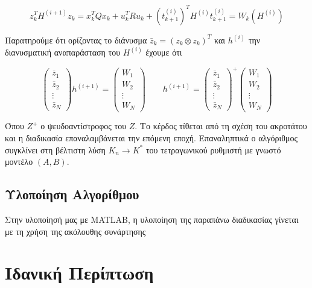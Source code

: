 \documentclass[a4paper,oneside,12pt]{article}
\begin{document}
$$z_k^T H^{(i+1)} z_k = x_k^T Q x_k + u_k^T R u_k + \left (t_{k+1}^{(i)} \right )^T H^{(i)} t_{k+1}^{(i)} = W_k (H^{(i)})$$

Παρατηρούμε ότι ορίζοντας το διάνυσμα $\bar z_k = (z_k \otimes z_k)^T$ και $h^{(i)}$ την διανυσματική αναπαράσταση του $H^{(i)}$ έχουμε ότι

\begin{equation}
	\begin{pmatrix}
		\bar z_1 \\ \bar z_2 \\ \vdots  \\ \bar z_N
	\end{pmatrix}
	h^{(i+1)} = 
	\begin{pmatrix}
		W_1 \\ W_2 \\ \vdots \\ W_N
	\end{pmatrix} \qquad
	h^{(i+1)} = 
		\begin{pmatrix}
		\bar z_1 \\ \bar z_2 \\ \vdots  \\ \bar z_N
	\end{pmatrix}^+
	\begin{pmatrix}
		W_1 \\ W_2 \\ \vdots \\ W_N
	\end{pmatrix}
\end{equation} 

Όπου $Z^+$ ο ψευδοαντίστροφος του $Z$. Το κέρδος τίθεται από τη σχέση του ακροτάτου και η διαδικασία επαναλαμβάνεται την επόμενη εποχή. Επαναληπτικά ο αλγόριθμος συγκλίνει στη βέλτιστη λύση $K_n \to K^*$ του τετραγωνικού ρυθμιστή με γνωστό μοντέλο $(A, B)$. 

\subsection{Υλοποίηση Αλγορίθμου}

Στην υλοποίησή μας με MATLAB, η υλοποίηση της παραπάνω διαδικασίας γίνεται με τη χρήση της ακόλουθης συνάρτησης




\section{Ιδανική Περίπτωση} 
\end{document}
